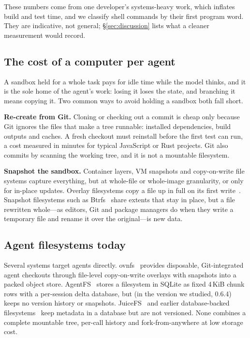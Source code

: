 \documentclass[letterpaper,twocolumn,10pt]{article}
\begin{document}
These numbers come from one developer's systems-heavy work, which inflates
build and test time, and we classify shell commands by their first program
word. They are indicative, not general; \S\ref{sec:discussion} lists what a
cleaner measurement would record.

\subsection{The cost of a computer per agent}

A sandbox held for a whole task pays for idle time while the model thinks,
and it is the sole home of the agent's work: losing it loses the state, and
branching it means copying it. Two common ways to avoid holding a sandbox
both fall short.

\textbf{Re-create from Git.} Cloning or checking out a commit is cheap only
because Git ignores the files that make a tree runnable: installed
dependencies, build outputs and caches. A fresh checkout must reinstall
before the first test can run, a cost measured in minutes for typical
JavaScript or Rust projects. Git also commits by scanning the working tree,
and it is not a mountable filesystem.

\textbf{Snapshot the sandbox.} Container layers, VM snapshots and
copy-on-write file systems capture everything, but at whole-file or
whole-image granularity, or only for in-place updates. Overlay filesystems
copy a file up in full on its first write~\cite{overlayfs}. Snapshot
filesystems such as Btrfs~\cite{btrfs} share extents that stay in place, but
a file rewritten whole---as editors, Git and package managers do when they
write a temporary file and rename it over the original---is new data.

\subsection{Agent filesystems today}

Several systems target agents directly. ovnfs~\cite{ovnfs} provides
disposable, Git-integrated agent checkouts through file-level copy-on-write
overlays with snapshots into a packed object store. AgentFS~\cite{agentfs}
stores a filesystem in SQLite as fixed 4\,KiB chunk rows with a per-session
delta database, but (in the version we studied, 0.6.4) keeps no version
history or snapshots. JuiceFS~\cite{juicefs} and earlier database-backed
filesystems~\cite{inversion,tablefs} keep metadata in a database but are not
versioned. None combines a complete mountable tree, per-call history and
fork-from-anywhere at low storage cost.
\end{document}
